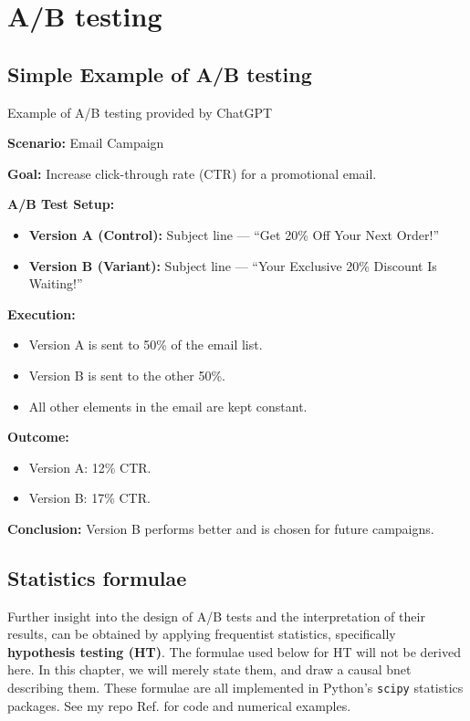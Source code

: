 \chapter{A/B testing}
\label{ch-a-b-testing}

\section{Simple Example of A/B testing} 
Example of A/B testing provided by ChatGPT

\textbf{Scenario:} Email Campaign

\textbf{Goal:} Increase click-through rate (CTR) for a promotional email.

\textbf{A/B Test Setup:}
\begin{itemize}
    \item \textbf{Version A (Control):} Subject line — ``Get 20\% Off Your Next Order!''
    \item \textbf{Version B (Variant):} Subject line — ``Your Exclusive 20\% Discount Is Waiting!''
\end{itemize}

\textbf{Execution:}
\begin{itemize}
    \item Version A is sent to 50\% of the email list.
    \item Version B is sent to the other 50\%.
    \item All other elements in the email are kept constant.
\end{itemize}

\textbf{Outcome:}
\begin{itemize}
    \item Version A: 12\% CTR.
    \item Version B: 17\% CTR.
\end{itemize}

\textbf{Conclusion:} Version B performs better and is chosen for future campaigns.

\section{Statistics formulae}
Further insight 
into the design of A/B tests and the interpretation
of their results, can be obtained by
applying frequentist statistics,
specifically {\bf hypothesis testing (HT)}.
The formulae used below for HT
will not be  derived here. 
In this chapter, we will merely state them,
and draw a causal bnet describing them.
These formulae are all implemented in Python's {\tt scipy} statistics packages. See my 
repo Ref.\cite{uplift_rocket}
for code and numerical examples.


